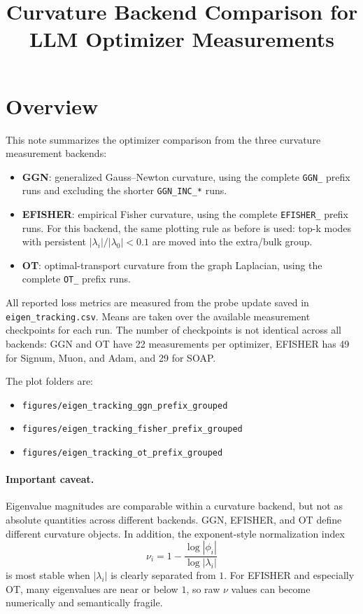 \documentclass[11pt]{article}
\title{Curvature Backend Comparison for LLM Optimizer Measurements}
\author{}
\date{}
\begin{document}
\maketitle

\section{Overview}

This note summarizes the optimizer comparison from the three curvature
measurement backends:
\begin{itemize}
    \item \textbf{GGN}: generalized Gauss--Newton curvature, using the complete
    \texttt{GGN\_} prefix runs and excluding the shorter \texttt{GGN\_INC\_*}
    runs.
    \item \textbf{EFISHER}: empirical Fisher curvature, using the complete
    \texttt{EFISHER\_} prefix runs. For this backend, the same plotting rule as
    before is used: top-k modes with persistent
    $|\lambda_i| / |\lambda_0| < 0.1$ are moved into the extra/bulk group.
    \item \textbf{OT}: optimal-transport curvature from the graph Laplacian,
    using the complete \texttt{OT\_} prefix runs.
\end{itemize}

All reported loss metrics are measured from the probe update saved in
\texttt{eigen\_tracking.csv}. Means are taken over the available measurement
checkpoints for each run. The number of checkpoints is not identical across all
backends: GGN and OT have 22 measurements per optimizer, EFISHER has 49 for
Signum, Muon, and Adam, and 29 for SOAP.

The plot folders are:
\begin{itemize}
    \item \texttt{figures/eigen\_tracking\_ggn\_prefix\_grouped}
    \item \texttt{figures/eigen\_tracking\_fisher\_prefix\_grouped}
    \item \texttt{figures/eigen\_tracking\_ot\_prefix\_grouped}
\end{itemize}

\paragraph{Important caveat.}
Eigenvalue magnitudes are comparable within a curvature backend, but not as
absolute quantities across different backends. GGN, EFISHER, and OT define
different curvature objects. In addition, the exponent-style normalization
index
\[
    \nu_i = 1 - \frac{\log |\phi_i|}{\log |\lambda_i|}
\]
is most stable when $|\lambda_i|$ is clearly separated from $1$. For EFISHER
and especially OT, many eigenvalues are near or below $1$, so raw $\nu$ values
can become numerically and semantically fragile.
\end{document}
